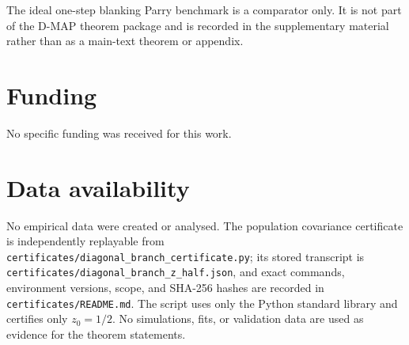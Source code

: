 

\begin{remark}
The ideal one-step blanking Parry benchmark is a comparator only.  It is not
part of the D-MAP theorem package and is recorded in the supplementary
material rather than as a main-text theorem or appendix.
\end{remark}

\section*{Funding}

No specific funding was received for this work.

\section*{Data availability}

No empirical data were created or analysed.  The population covariance
certificate is independently replayable from
\texttt{certificates/diagonal\_branch\_certificate.py}; its stored transcript
is \texttt{certificates/diagonal\_branch\_z\_half.json}, and exact commands,
environment versions, scope, and SHA-256 hashes are recorded in
\texttt{certificates/README.md}.  The script uses only the Python standard
library and certifies only \(z_0=1/2\).  No simulations, fits, or validation
data are used as evidence for the theorem statements.

\clearpage
\newcommand{\MAINARTICLEBIB}{}



